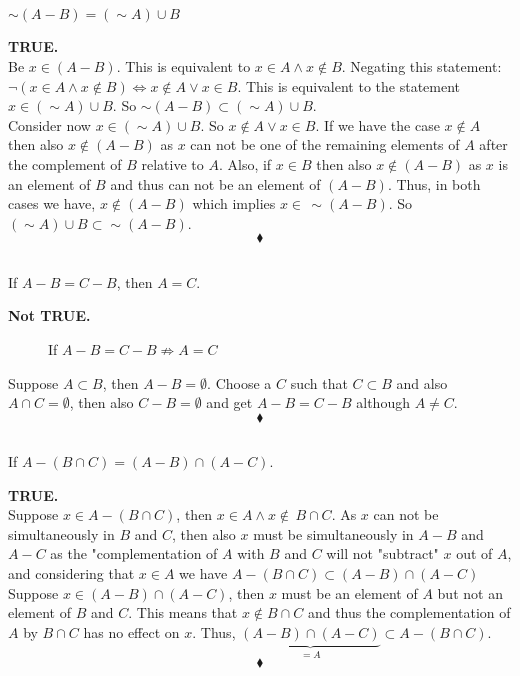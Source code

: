 \subsection{}
\begin{tcolorbox}
$\sim(A-B)=(\sim A)\cup B$
\end{tcolorbox}
\textbf{TRUE.}\\
Be $x\in (A-B)$. This is equivalent to $x \in  A \wedge x \not\in B $. Negating this statement: $\lnot(x \in  A \wedge x \not\in B )\Leftrightarrow x \not \in  A \vee x \in B $. This is equivalent to the statement $x\in (\sim A)\cup B$. So $\sim(A-B)\subset (\sim A)\cup B$.\\
Consider now $x\in (\sim A)\cup B$. So $x \not \in  A \vee x \in B $. If we have the case $x \not \in  A $ then also $x\not \in (A-B)$ as $x$ can not be one of the remaining elements of $A$ after the complement of $B$ relative to $A$. Also, if  $x \in  B $ then also $x\not \in (A-B)$ as $x$ is an element of $B$ and thus can not be an element of $(A-B)$. Thus, in both cases we have, $x\not \in (A-B)$ which implies $x \in\, \sim (A-B)$. So $ (\sim A)\cup B\subset\sim(A-B)$.\\
$$\blacklozenge$$

\subsection{}
\begin{tcolorbox}
If $A-B=C-B$, then $A=C$.
\end{tcolorbox}
\textbf{Not TRUE.}\\
\begin{figure}[H]%
    \centering
    
\caption{If $A-B=C-B\not\Rightarrow A=C$}
\label{fig:fig_p8b}
\end{figure}
Suppose $A\subset B$, then $A-B=\emptyset$. Choose a $C$ such that $C\subset B$ and also $A\cap C=\emptyset$, then also $C-B=\emptyset$ and get $A-B=C-B$ although $A\ne C$.
$$\blacklozenge$$

\subsection{}
\begin{tcolorbox}
If $A-(B\cap C)=(A-B)\cap (A-C)$.
\end{tcolorbox}
\textbf{TRUE.}\\

Suppose $x\in A-(B\cap C)$, then $x\in A \wedge x\not\in \,B\cap C$. As $x$ can not be simultaneously in $B$ and $C$, then also $x$ must be simultaneously in $A-B$ and $A-C$ as the "complementation of $A$ with $B$ and $C$ will not "subtract" $x$ out of $A$,  and considering that $x\in A$ we have $A-(B\cap C)\subset(A-B)\cap (A-C)$\\
Suppose $x\in (A-B)\cap (A-C)$, then $x$ must be an element of $A$ but not an element of $B$ and $C$. This means that $x\not\in B\cap C$ and thus the complementation of $A$ by $B\cap C$ has no effect on $x$. Thus, $\underbrace{(A-B)\cap (A-C)}_{= A} \subset A-(B\cap C)$.
$$\blacklozenge$$
\newpage
